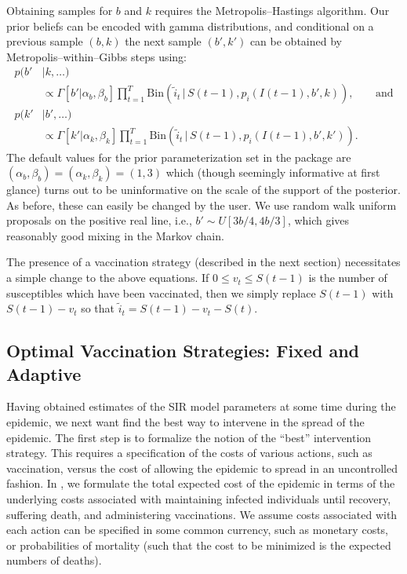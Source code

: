 \documentclass[shortnames,nojss]{jss}
\begin{document}
Obtaining samples for $b$ and $k$ requires the Metropolis--Hastings
algorithm.  Our prior beliefs can be encoded with gamma distributions,
and conditional on a previous sample $(b,k)$ the next sample $(b',k')$
can be obtained by Metropolis--within--Gibbs steps using:
\begin{align}
  p(b'&| k,\dots) \\
& \propto \Gamma[b' | \alpha_b,\beta_b] \prod_{t=1}^T
  \mbox{Bin}(\tilde{i}_t \,|\,
  S(t-1), p_i(I(t-1),b',k)), && \mbox{and} \nonumber \\
  p(k'&| b',\dots) \\
&\propto \Gamma[k' | \alpha_k,\beta_k] \prod_{t=1}^T
  \mbox{Bin}(\tilde{i}_t \,|\, S(t-1), p_i(I(t-1),b',k')). \nonumber
\end{align}
The default values for the prior parameterization set in the package
are $(\alpha_b, \beta_b) = (\alpha_k, \beta_k) = (1, 3)$ which (though
seemingly informative at first glance) turns out to be uninformative
on the scale of the support of the posterior.  As before, these can
easily be changed by the user.  We use random walk uniform proposals
on the positive real line, i.e., $b' \sim U[3b/4,4b/3]$, which gives
reasonably good mixing in the Markov chain.

The presence of a vaccination strategy (described in the next
section) necessitates a simple change to the above equations.  If $0
\leq v_t \leq S(t-1)$ is the number of susceptibles which have been
vaccinated, then we simply replace $S(t-1)$ with $S(t-1) - v_t$
so that $\tilde{i}_t=S(t-1)-v_t-S(t)$.

\subsection{Optimal Vaccination Strategies: Fixed and Adaptive}
\label{sec:optvac}

Having obtained estimates of the SIR model parameters at some time
during the epidemic, we next want find the best way to intervene in
the spread of the epidemic. The first step is to formalize the notion
of the ``best'' intervention strategy. This requires a specification
of the costs of various actions, such as vaccination, versus the cost
of allowing the epidemic to spread in an uncontrolled fashion. In
, we formulate the total expected cost of the epidemic in
terms of the underlying costs associated with maintaining infected
individuals until recovery, suffering death, and administering
vaccinations. We assume costs associated with each action can be
specified in some common currency, such as monetary costs, or
probabilities of mortality (such that the cost to be minimized is the
expected numbers of deaths).
\end{document}
